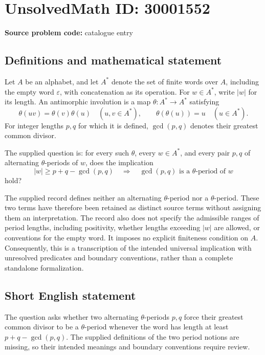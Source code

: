 \documentclass[11pt]{article}
\begin{document}
\section*{UnsolvedMath ID: 30001552}
\textbf{Source problem code:} catalogue entry
\subsection{Definitions and mathematical statement}
Let \(A\) be an alphabet, and let \(A^*\) denote the set of finite words over \(A\), including the empty word \(\varepsilon\), with concatenation as its operation. For \(w\in A^*\), write \(|w|\) for its length. An antimorphic involution is a map \(\theta:A^*\to A^*\) satisfying
\[
\theta(uv)=\theta(v)\theta(u)\quad(u,v\in A^*),
\qquad
\theta(\theta(u))=u\quad(u\in A^*).
\]
For integer lengths \(p,q\) for which it is defined, \(\gcd(p,q)\) denotes their greatest common divisor.

The supplied question is: for every such \(\theta\), every \(w\in A^*\), and every pair \(p,q\) of alternating \(\theta\)-periods of \(w\), does the implication
\[
|w|\geq p+q-\gcd(p,q)
\quad\Longrightarrow\quad
\gcd(p,q)\text{ is a }\theta\text{-period of }w
\]
hold?

The supplied record defines neither an alternating \(\theta\)-period nor a \(\theta\)-period. These two terms have therefore been retained as distinct source terms without assigning them an interpretation. The record also does not specify the admissible ranges of period lengths, including positivity, whether lengths exceeding \(|w|\) are allowed, or conventions for the empty word. It imposes no explicit finiteness condition on \(A\). Consequently, this is a transcription of the intended universal implication with unresolved predicates and boundary conventions, rather than a complete standalone formalization.
\subsection{Short English statement}
The question asks whether two alternating \(\theta\)-periods \(p,q\) force their greatest common divisor to be a \(\theta\)-period whenever the word has length at least \(p+q-\gcd(p,q)\). The supplied definitions of the two period notions are missing, so their intended meanings and boundary conventions require review.
\end{document}
